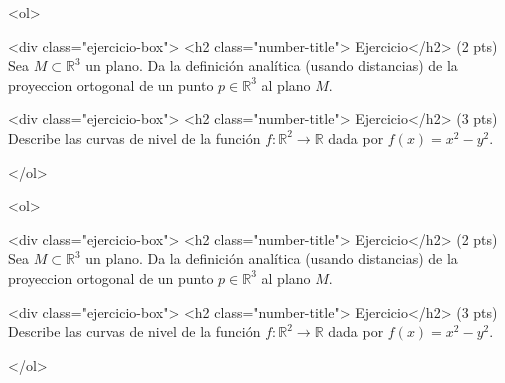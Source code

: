 \documentclass[12pt]{article}
\begin{document}
\bigskip

            
\bigskip
\bigskip
\bigskip


<ol>

<div class="ejercicio-box"> <h2 class="number-title"> Ejercicio</h2> (2 pts) Sea $M\subset \mathbb{R}^3$ un plano. Da la definición analítica (usando distancias) de la proyeccion
  ortogonal de un punto $p\in \mathbb{R}^3$ al plano $M$. 
\vspace{3cm}
  
<div class="ejercicio-box"> <h2 class="number-title"> Ejercicio</h2> (3 pts) Describe las curvas de nivel de la función $f:\mathbb{R}^2\to \mathbb{R}$ dada por $f(x)=x^2-y^2$.



  </ol>


  \vspace{3cm}

\bigskip

            
\bigskip
\bigskip
\bigskip


<ol>

<div class="ejercicio-box"> <h2 class="number-title"> Ejercicio</h2> (2 pts) Sea $M\subset \mathbb{R}^3$ un plano. Da la definición analítica (usando distancias) de la proyeccion
  ortogonal de un punto $p\in \mathbb{R}^3$ al plano $M$. 
\vspace{3cm}
  
<div class="ejercicio-box"> <h2 class="number-title"> Ejercicio</h2> (3 pts) Describe las curvas de nivel de la función $f:\mathbb{R}^2\to \mathbb{R}$ dada por $f(x)=x^2-y^2$.



  </ol>

  
  
\end{document}
